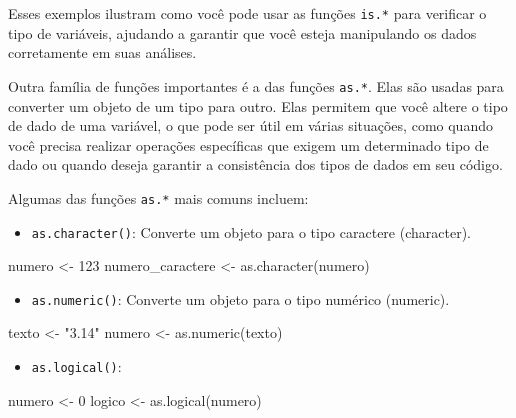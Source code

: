 \documentclass[
  letterpaper,
  DIV=11,
  numbers=noendperiod]{scrreprt}
\newenvironment{Shaded}{\begin{snugshade}}{\end{snugshade}}
\newcommand{\DecValTok}[1]{\textcolor[rgb]{0.68,0.00,0.00}{#1}}
\newcommand{\FunctionTok}[1]{\textcolor[rgb]{0.28,0.35,0.67}{#1}}
\newcommand{\NormalTok}[1]{\textcolor[rgb]{0.00,0.23,0.31}{#1}}
\newcommand{\OtherTok}[1]{\textcolor[rgb]{0.00,0.23,0.31}{#1}}
\newcommand{\StringTok}[1]{\textcolor[rgb]{0.13,0.47,0.30}{#1}}
\providecommand{\tightlist}{%
  \setlength{\itemsep}{0pt}\setlength{\parskip}{0pt}}\usepackage{longtable,booktabs,array}
\begin{document}
Esses exemplos ilustram como você pode usar as funções \texttt{is.*}
para verificar o tipo de variáveis, ajudando a garantir que você esteja
manipulando os dados corretamente em suas análises.

Outra família de funções importantes é a das funções \texttt{as.*}. Elas
são usadas para converter um objeto de um tipo para outro. Elas permitem
que você altere o tipo de dado de uma variável, o que pode ser útil em
várias situações, como quando você precisa realizar operações
específicas que exigem um determinado tipo de dado ou quando deseja
garantir a consistência dos tipos de dados em seu código.

Algumas das funções \texttt{as.*} mais comuns incluem:

\begin{itemize}
\tightlist
\item
  \texttt{as.character()}: Converte um objeto para o tipo caractere
  (character).
\end{itemize}

\begin{Shaded}
\begin{Highlighting}[]
\NormalTok{numero }\OtherTok{\textless{}{-}} \DecValTok{123}
\NormalTok{numero\_caractere }\OtherTok{\textless{}{-}} \FunctionTok{as.character}\NormalTok{(numero)}
\end{Highlighting}
\end{Shaded}

\begin{itemize}
\tightlist
\item
  \texttt{as.numeric()}: Converte um objeto para o tipo numérico
  (numeric).
\end{itemize}

\begin{Shaded}
\begin{Highlighting}[]
\NormalTok{texto }\OtherTok{\textless{}{-}} \StringTok{"3.14"}
\NormalTok{numero }\OtherTok{\textless{}{-}} \FunctionTok{as.numeric}\NormalTok{(texto)}
\end{Highlighting}
\end{Shaded}

\begin{itemize}
\tightlist
\item
  \texttt{as.logical()}:
\end{itemize}

\begin{Shaded}
\begin{Highlighting}[]
\NormalTok{numero }\OtherTok{\textless{}{-}} \DecValTok{0}
\NormalTok{logico }\OtherTok{\textless{}{-}} \FunctionTok{as.logical}\NormalTok{(numero)}
\end{Highlighting}
\end{Shaded}
\end{document}
